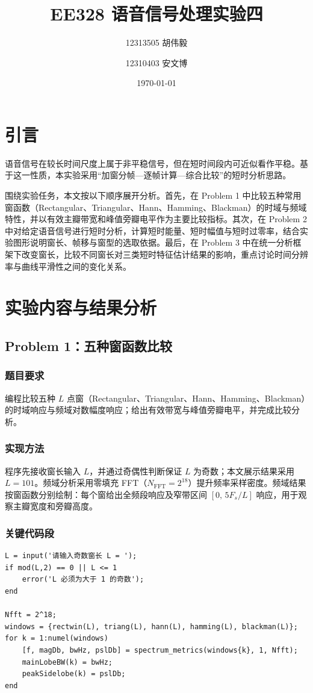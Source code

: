 \documentclass[12pt,a4paper]{ctexart}
\title{\vspace{-1.2cm}EE328 语音信号处理实验四\\}
\author{
    12313505 胡伟毅\and
    12310403 安文博
}
\date{\today}
\begin{document}
\maketitle
\thispagestyle{empty}

\section{引言}
语音信号在较长时间尺度上属于非平稳信号，但在短时间段内可近似看作平稳。基于这一性质，本实验采用“加窗分帧—逐帧计算—综合比较”的短时分析思路。

围绕实验任务，本文按以下顺序展开分析。首先，在 Problem 1 中比较五种常用窗函数（Rectangular、Triangular、Hann、Hamming、Blackman）的时域与频域特性，并以有效主瓣带宽和峰值旁瓣电平作为主要比较指标。其次，在 Problem 2 中对给定语音信号进行短时分析，计算短时能量、短时幅值与短时过零率，结合实验图形说明窗长、帧移与窗型的选取依据。最后，在 Problem 3 中在统一分析框架下改变窗长，比较不同窗长对三类短时特征估计结果的影响，重点讨论时间分辨率与曲线平滑性之间的变化关系。


\section{实验内容与结果分析}

\subsection{Problem 1：五种窗函数比较}
\subsubsection*{题目要求}
编程比较五种 $L$ 点窗（Rectangular、Triangular、Hann、Hamming、Blackman）的时域响应与频域对数幅度响应；给出有效带宽与峰值旁瓣电平，并完成比较分析。

\subsubsection*{实现方法}
程序先接收窗长输入 $L$，并通过奇偶性判断保证 $L$ 为奇数；本文展示结果采用 $L=101$。频域分析采用零填充 FFT（$N_{\text{FFT}}=2^{18}$）提升频率采样密度。频域结果按窗函数分别绘制：每个窗给出全频段响应及窄带区间 $[0,\,5F_s/L]$ 响应，用于观察主瓣宽度和旁瓣高度。

\subsubsection*{关键代码段}
\begin{lstlisting}[caption={Problem 1：零填充频谱与指标提取}]
L = input('请输入奇数窗长 L = ');
if mod(L,2) == 0 || L <= 1
    error('L 必须为大于 1 的奇数');
end

Nfft = 2^18;
windows = {rectwin(L), triang(L), hann(L), hamming(L), blackman(L)};
for k = 1:numel(windows)
    [f, magDb, bwHz, pslDb] = spectrum_metrics(windows{k}, 1, Nfft);
    mainLobeBW(k) = bwHz;
    peakSidelobe(k) = pslDb;
end
\end{lstlisting}
\end{document}
